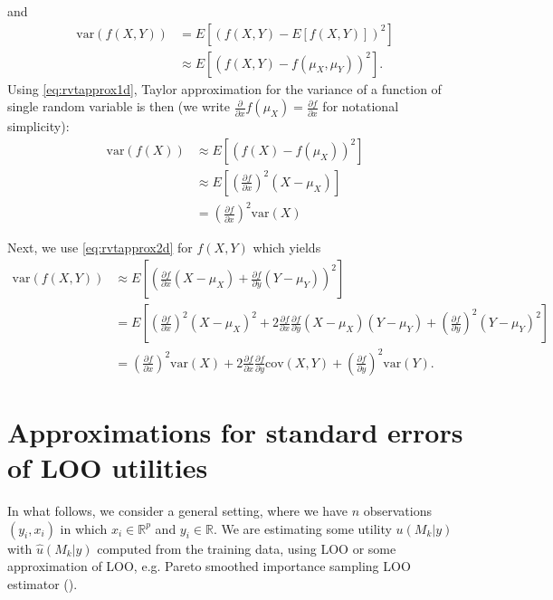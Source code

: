 \documentclass{article}
\begin{document}
and
\begin{align}
    \text{var}(f(X, Y)) &= E\left[ \left(f(X, Y) - E[f(X,Y)] \right)^2 \right] \nonumber \\
    &\approx E\left[ \left( f(X, Y) - f(\mu_X, \mu_Y) \right)^2 \right] \nonumber.
\end{align}
Using \eqref{eq:rvtapprox1d}, Taylor approximation for the variance of a function of single random variable is then (we write $\frac{\partial }{\partial x} f(\mu_X) = \frac{\partial f}{\partial x}$ for notational simplicity):
\begin{align}
    \text{var}(f(X)) &\approx E\left[ \left( f(X) - f(\mu_X) \right)^2 \right] \nonumber \\
    &\approx E\left[ \left( \frac{\partial f}{\partial x} \right)^2 (X - \mu_X) \right] \nonumber \\
    &= \left( \frac{\partial f}{\partial x} \right)^2 \text{var}(X) \label{eq:varapprox1d}
\end{align}

Next, we use \eqref{eq:rvtapprox2d} for $f(X,Y)$ which yields
\begin{align}
    \text{var}(f(X, Y)) &\approx E\left[ \left( \frac{\partial f}{\partial x} (X - \mu_X) + \frac{\partial f}{\partial y} (Y - \mu_Y) \right)^2 \right] \nonumber \\
    &= E\left[ \left( \frac{\partial f}{\partial x}  \right)^2 (X - \mu_X)^2 + 2 \frac{\partial f}{\partial x} \frac{\partial f}{\partial y} (X - \mu_X)(Y - \mu_Y) + \left( \frac{\partial f}{\partial y}  \right)^2 (Y - \mu_Y)^2  \right] \nonumber \\
    &= \left( \frac{\partial f}{\partial x}  \right)^2 \text{var}(X) + 2 \frac{\partial f}{\partial x} \frac{\partial f}{\partial y} \text{cov}(X, Y) + \left( \frac{\partial f}{\partial y}  \right)^2 \text{var}(Y). \label{eq:varapprox2d}
\end{align}

\section{Approximations for standard errors of LOO utilities}
In what follows, we consider a general setting, where we have $n$ observations $(y_i, x_i)$ in which $x_i \in \mathbb{R}^p$ and $y_i \in \mathbb{R}$. We are estimating some utility $u(M_k | y)$ with $\hat{u}(M_k |y)$ computed from the training data, using LOO or some approximation of LOO, e.g. Pareto smoothed importance sampling LOO estimator (\cite{vehtari_practical_2016}).
\end{document}
